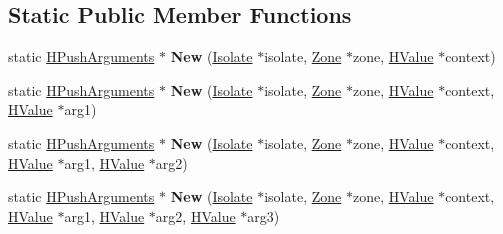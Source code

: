 \subsection*{Static Public Member Functions}
\begin{DoxyCompactItemize}
\item 
static \hyperlink{classv8_1_1internal_1_1_h_push_arguments}{H\+Push\+Arguments} $\ast$ {\bfseries New} (\hyperlink{classv8_1_1internal_1_1_isolate}{Isolate} $\ast$isolate, \hyperlink{classv8_1_1internal_1_1_zone}{Zone} $\ast$zone, \hyperlink{classv8_1_1internal_1_1_h_value}{H\+Value} $\ast$context)\hypertarget{classv8_1_1internal_1_1_h_push_arguments_aa6011b4496f66d453d0fca0ae007ace0}{}\label{classv8_1_1internal_1_1_h_push_arguments_aa6011b4496f66d453d0fca0ae007ace0}

\item 
static \hyperlink{classv8_1_1internal_1_1_h_push_arguments}{H\+Push\+Arguments} $\ast$ {\bfseries New} (\hyperlink{classv8_1_1internal_1_1_isolate}{Isolate} $\ast$isolate, \hyperlink{classv8_1_1internal_1_1_zone}{Zone} $\ast$zone, \hyperlink{classv8_1_1internal_1_1_h_value}{H\+Value} $\ast$context, \hyperlink{classv8_1_1internal_1_1_h_value}{H\+Value} $\ast$arg1)\hypertarget{classv8_1_1internal_1_1_h_push_arguments_aae780e2b6b8d33a38e88606e0401460e}{}\label{classv8_1_1internal_1_1_h_push_arguments_aae780e2b6b8d33a38e88606e0401460e}

\item 
static \hyperlink{classv8_1_1internal_1_1_h_push_arguments}{H\+Push\+Arguments} $\ast$ {\bfseries New} (\hyperlink{classv8_1_1internal_1_1_isolate}{Isolate} $\ast$isolate, \hyperlink{classv8_1_1internal_1_1_zone}{Zone} $\ast$zone, \hyperlink{classv8_1_1internal_1_1_h_value}{H\+Value} $\ast$context, \hyperlink{classv8_1_1internal_1_1_h_value}{H\+Value} $\ast$arg1, \hyperlink{classv8_1_1internal_1_1_h_value}{H\+Value} $\ast$arg2)\hypertarget{classv8_1_1internal_1_1_h_push_arguments_a63a276ddba61cfd2dd6ebf3565d54884}{}\label{classv8_1_1internal_1_1_h_push_arguments_a63a276ddba61cfd2dd6ebf3565d54884}

\item 
static \hyperlink{classv8_1_1internal_1_1_h_push_arguments}{H\+Push\+Arguments} $\ast$ {\bfseries New} (\hyperlink{classv8_1_1internal_1_1_isolate}{Isolate} $\ast$isolate, \hyperlink{classv8_1_1internal_1_1_zone}{Zone} $\ast$zone, \hyperlink{classv8_1_1internal_1_1_h_value}{H\+Value} $\ast$context, \hyperlink{classv8_1_1internal_1_1_h_value}{H\+Value} $\ast$arg1, \hyperlink{classv8_1_1internal_1_1_h_value}{H\+Value} $\ast$arg2, \hyperlink{classv8_1_1internal_1_1_h_value}{H\+Value} $\ast$arg3)\hypertarget{classv8_1_1internal_1_1_h_push_arguments_a56923d3a460b3e122c1aca4395e7ac7a}{}\label{classv8_1_1internal_1_1_h_push_arguments_a56923d3a460b3e122c1aca4395e7ac7a}


\end{DoxyCompactItemize}
